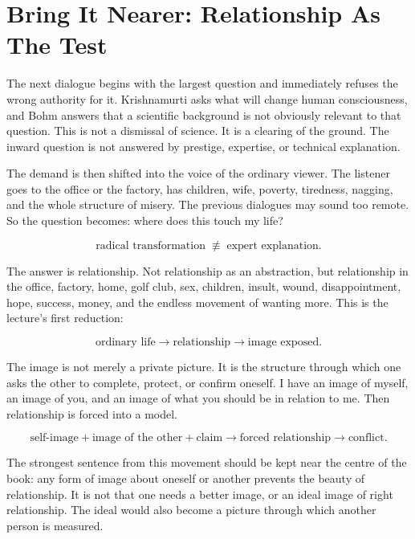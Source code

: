 \documentclass[11pt,oneside]{book}
\begin{document}
\section{Bring It Nearer: Relationship As The Test}

The next dialogue begins with the largest question and immediately refuses the wrong authority for it. Krishnamurti asks what will change human consciousness, and Bohm answers that a scientific background is not obviously relevant to that question. This is not a dismissal of science. It is a clearing of the ground. The inward question is not answered by prestige, expertise, or technical explanation.

The demand is then shifted into the voice of the ordinary viewer. The listener goes to the office or the factory, has children, wife, poverty, tiredness, nagging, and the whole structure of misery. The previous dialogues may sound too remote. So the question becomes: where does this touch my life?

\begin{equation}
\text{radical transformation}
\;\not\equiv\;
\text{expert explanation}.
\end{equation}

The answer is relationship. Not relationship as an abstraction, but relationship in the office, factory, home, golf club, sex, children, insult, wound, disappointment, hope, success, money, and the endless movement of wanting more. This is the lecture's first reduction:

\begin{equation}
\text{ordinary life}
\longrightarrow
\text{relationship}
\longrightarrow
\text{image exposed}.
\end{equation}

The image is not merely a private picture. It is the structure through which one asks the other to complete, protect, or confirm oneself. I have an image of myself, an image of you, and an image of what you should be in relation to me. Then relationship is forced into a model.

\begin{equation}
\text{self-image}
+
\text{image of the other}
+
\text{claim}
\longrightarrow
\text{forced relationship}
\longrightarrow
\text{conflict}.
\end{equation}

The strongest sentence from this movement should be kept near the centre of the book: any form of image about oneself or another prevents the beauty of relationship. It is not that one needs a better image, or an ideal image of right relationship. The ideal would also become a picture through which another person is measured.
\end{document}
